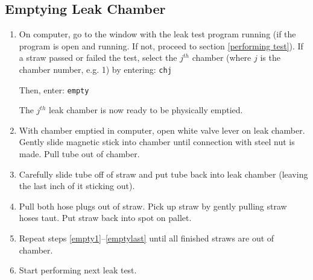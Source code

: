 \documentclass[A4,12pt]{article}
\begin{document}
\subsection{Emptying Leak Chamber}
	\begin{enumerate}
		\item On computer, go to the window with the leak test program running (if the program is open and running. If not, proceed to section \ref{performing test}). If a straw passed or failed the test, select the $j^{th}$ chamber (where $j$ is the chamber number, e.g. 1) by entering: \texttt{chj} 
		
Then, enter: \texttt{empty}

The $j^{th}$ leak chamber is now ready to be physically emptied. \label{empty1}

	\item With chamber emptied in computer, open white valve lever on leak chamber. Gently slide magnetic stick into chamber until connection with steel nut is made. Pull tube out of chamber.
	\item Carefully slide tube off of straw and put tube back into leak chamber (leaving the last inch of it sticking out). 
	\item Pull both hose plugs out of straw. Pick up straw by gently pulling straw hoses taut. Put straw back into spot on pallet. \label{emptylast}
	\item Repeat steps \ref{empty1}--\ref{emptylast} until all finished straws are out of chamber.
	\item Start performing next leak test.
	
\end{enumerate}
\end{document}
